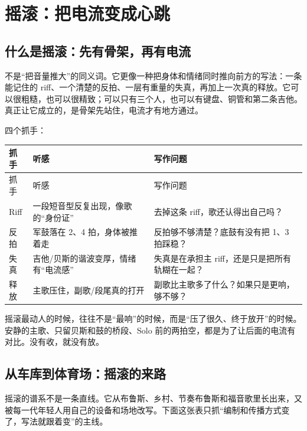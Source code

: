 \chapter{摇滚：把电流变成心跳}
\label{ch:genre-rock-deep}


\section{什么是摇滚：先有骨架，再有电流}
\label{sec:rock-what}

不是“把音量推大”的同义词。它更像一种把身体和情绪同时推向前方的写法：一条能记住的 riff、一个清楚的反拍、一层有重量的失真，再加上一次真的释放。它可以很粗糙，也可以很精致；可以只有三个人，也可以有键盘、铜管和第二条吉他。真正让它成立的，是骨架先站住，电流才有地方通过。

四个抓手：

\begin{longtable}{p{}p{}p{}}
\toprule
抓手 & 听感 & 写作问题 \\
\midrule
\endfirsthead
\toprule
抓手 & 听感 & 写作问题 \\
\midrule
\endhead
Riff & 一段短音型反复出现，像歌的“身份证” & 去掉这条 riff，歌还认得出自己吗？ \\
反拍 & 军鼓落在 2、4 拍，身体被推着走 & 反拍够不够清楚？底鼓有没有把 1、3 拍踩稳？ \\
失真 & 吉他/贝斯的谐波变厚，情绪有“电流感” & 失真是在承担主 riff，还是只是把所有轨糊在一起？ \\
释放 & 主歌压住，副歌/段尾真的打开 & 副歌比主歌多了什么？如果只是更响，够不够？ \\
\bottomrule
\end{longtable}

摇滚最动人的时候，往往不是“最响”的时候，而是“压了很久、终于放开”的时候。安静的主歌、只留贝斯和鼓的桥段、Solo 前的两拍空，都是为了让后面的电流有对比。没有收，就没有放。

\section{从车库到体育场：摇滚的来路}
\label{sec:rock-history}

摇滚的谱系不是一条直线。它从布鲁斯、乡村、节奏布鲁斯和福音歌里长出来，又被每一代年轻人用自己的设备和场地改写。下面这张表只抓“编制和传播方式变了，写法就跟着变”的主线。

